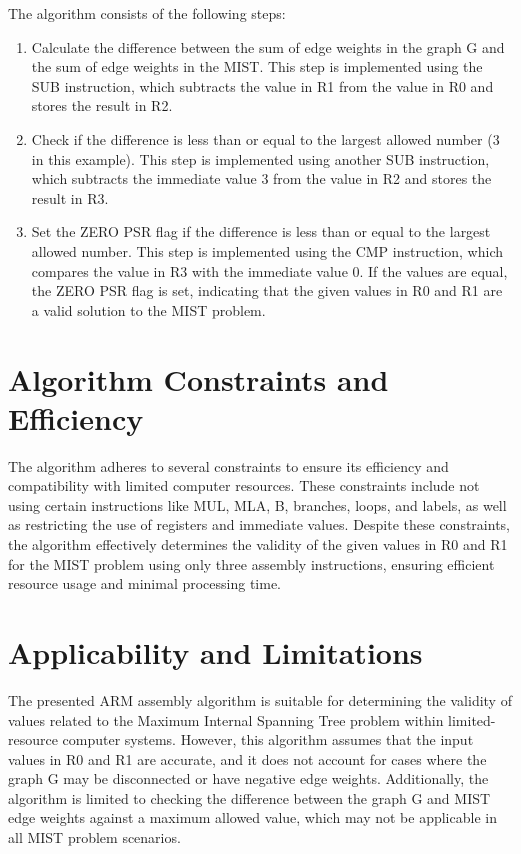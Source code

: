 The algorithm consists of the following steps:

\begin{enumerate}
    \item Calculate the difference between the sum of edge weights in the graph G and the sum of edge weights in the MIST. This step is implemented using the SUB instruction, which subtracts the value in R1 from the value in R0 and stores the result in R2.
    
    \item Check if the difference is less than or equal to the largest allowed number (3 in this example). This step is implemented using another SUB instruction, which subtracts the immediate value 3 from the value in R2 and stores the result in R3.
    
    \item Set the ZERO PSR flag if the difference is less than or equal to the largest allowed number. This step is implemented using the CMP instruction, which compares the value in R3 with the immediate value 0. If the values are equal, the ZERO PSR flag is set, indicating that the given values in R0 and R1 are a valid solution to the MIST problem.
\end{enumerate}

\section{Algorithm Constraints and Efficiency}

The algorithm adheres to several constraints to ensure its efficiency and compatibility with limited computer resources. These constraints include not using certain instructions like MUL, MLA, B, branches, loops, and labels, as well as restricting the use of registers and immediate values. Despite these constraints, the algorithm effectively determines the validity of the given values in R0 and R1 for the MIST problem using only three assembly instructions, ensuring efficient resource usage and minimal processing time.

\section{Applicability and Limitations}

The presented ARM assembly algorithm is suitable for determining the validity of values related to the Maximum Internal Spanning Tree problem within limited-resource computer systems. However, this algorithm assumes that the input values in R0 and R1 are accurate, and it does not account for cases where the graph G may be disconnected or have negative edge weights. Additionally, the algorithm is limited to checking the difference between the graph G and MIST edge weights against a maximum allowed value, which may not be applicable in all MIST problem scenarios.

